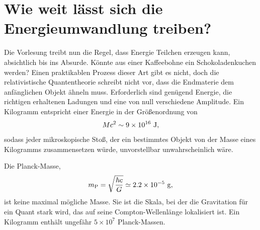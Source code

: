 \begin{classroomqa}
\end{classroomqa}

\section{Wie weit lässt sich die Energieumwandlung treiben?}

Die Vorlesung treibt nun die Regel, dass Energie Teilchen erzeugen kann, absichtlich bis ins Absurde. Könnte aus einer Kaffeebohne ein Schokoladenkuchen werden?
Einen praktikablen Prozess dieser Art gibt es nicht, doch die relativistische Quantentheorie schreibt nicht vor, dass die Endmaterie dem anfänglichen Objekt ähneln muss. Erforderlich sind genügend Energie, die richtigen erhaltenen Ladungen und eine von null verschiedene Amplitude. Ein Kilogramm entspricht einer Energie in der Größenordnung von
\begin{equation}
  Mc^2\sim9\times10^{16}\ {\rm J},
\end{equation}
sodass jeder mikroskopische Stoß, der ein bestimmtes Objekt von der Masse eines Kilogramms zusammensetzen würde, unvorstellbar unwahrscheinlich wäre.

Die Planck-Masse,
\begin{equation}
  m_{\rm P}=\sqrt{\frac{\hbar c}{G}}
  \simeq2.2\times10^{-5}\ {\rm g},
\end{equation}
ist keine maximal mögliche Masse. Sie ist die Skala, bei der die Gravitation für ein Quant stark wird, das auf seine Compton-Wellenlänge lokalisiert ist. Ein Kilogramm enthält ungefähr \(5\times10^7\) Planck-Massen.

\begin{classroomqa}
\end{classroomqa}

